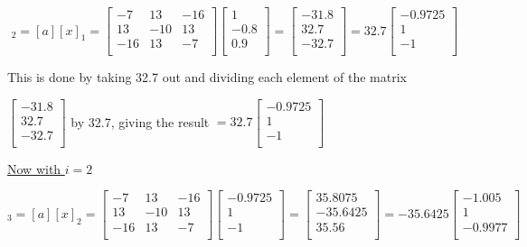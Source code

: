 \documentclass{article}
\begin{document}
\begin{equation*}
[x]_2 = [a][x]_1 =
\begin{bmatrix}
-7 & 13 & -16 \\
13 & -10 & 13 \\
-16 & 13 & -7 \\
\end{bmatrix}
\begin{bmatrix}
1 \\
-0.8 \\
0.9 \\
\end{bmatrix}
=
\begin{bmatrix}
-31.8 \\
32.7\\
-32.7 \\
\end{bmatrix}
= 32.7
\begin{bmatrix}
 -0.9725\\
1\\
-1\\
\end{bmatrix}
\end{equation*}

This is done by taking 32.7 out and dividing each element of the matrix 

$
\begin{bmatrix}
-31.8 \\
32.7\\
-32.7 \\
\end{bmatrix}
$
by 32.7, giving the result
$
= 32.7
\begin{bmatrix}
 -0.9725\\
1\\
-1\\
\end{bmatrix}
$
\newline

\underline{Now with $i = 2$}


\begin{equation*}
[x]_3 = [a][x]_2 =
\begin{bmatrix}
-7 & 13 & -16 \\
13 & -10 & 13 \\
-16 & 13 & -7 \\
\end{bmatrix}
\begin{bmatrix}
 -0.9725\\
1\\
-1\\
\end{bmatrix}
=
\begin{bmatrix}
35.8075\\
-35.6425\\
 35.56\\
\end{bmatrix}
= -35.6425
\begin{bmatrix}
-1.005\\
1\\
-0.9977\\
\end{bmatrix}
\end{equation*}
\end{document}
